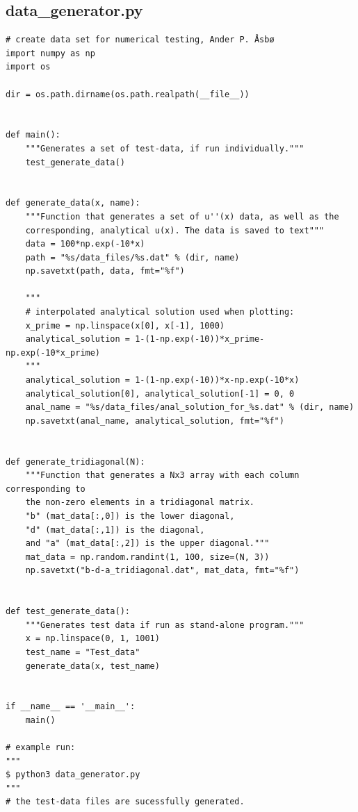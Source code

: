 \documentclass[english,notitlepage]{revtex4-1}  %
\begin{document}
\subsection{data\_generator.py} \label{A:3}
\begin{lstlisting}
# create data set for numerical testing, Ander P. Åsbø
import numpy as np
import os

dir = os.path.dirname(os.path.realpath(__file__))


def main():
    """Generates a set of test-data, if run individually."""
    test_generate_data()


def generate_data(x, name):
    """Function that generates a set of u''(x) data, as well as the
    corresponding, analytical u(x). The data is saved to text"""
    data = 100*np.exp(-10*x)
    path = "%s/data_files/%s.dat" % (dir, name)
    np.savetxt(path, data, fmt="%f")

    """
    # interpolated analytical solution used when plotting:
    x_prime = np.linspace(x[0], x[-1], 1000)
    analytical_solution = 1-(1-np.exp(-10))*x_prime-np.exp(-10*x_prime)
    """
    analytical_solution = 1-(1-np.exp(-10))*x-np.exp(-10*x)
    analytical_solution[0], analytical_solution[-1] = 0, 0
    anal_name = "%s/data_files/anal_solution_for_%s.dat" % (dir, name)
    np.savetxt(anal_name, analytical_solution, fmt="%f")


def generate_tridiagonal(N):
    """Function that generates a Nx3 array with each column corresponding to
    the non-zero elements in a tridiagonal matrix.
    "b" (mat_data[:,0]) is the lower diagonal,
    "d" (mat_data[:,1]) is the diagonal,
    and "a" (mat_data[:,2]) is the upper diagonal."""
    mat_data = np.random.randint(1, 100, size=(N, 3))
    np.savetxt("b-d-a_tridiagonal.dat", mat_data, fmt="%f")


def test_generate_data():
    """Generates test data if run as stand-alone program."""
    x = np.linspace(0, 1, 1001)
    test_name = "Test_data"
    generate_data(x, test_name)


if __name__ == '__main__':
    main()

# example run:
"""
$ python3 data_generator.py
"""
# the test-data files are sucessfully generated.

\end{lstlisting}
\end{document}
